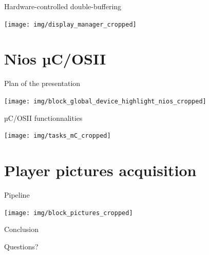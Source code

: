 \documentclass[10pt, notes]{beamer}
\begin{document}
\begin{frame}{Hardware-controlled double-buffering}
    \begin{center}
        \texttt{[image: img/display\_manager\_cropped]}
    \end{center}
    

\end{frame}

\section{Nios µC/OSII}
\begin{frame}{Plan of the presentation}
    \begin{center}
        \texttt{[image: img/block\_global\_device\_highlight\_nios\_cropped]}
    \end{center}
\end{frame}

\begin{frame}{µC/OSII functionnalities}
    \begin{center}
        \texttt{[image: img/tasks\_mC\_cropped]}
    \end{center}
\end{frame}

\section{Player pictures acquisition}

\begin{frame}{Pipeline}
    \begin{center}
        \texttt{[image: img/block\_pictures\_cropped]}
    \end{center}
\end{frame}

\begin{frame}[standout]
    Conclusion
\end{frame}

\begin{frame}[standout]
    Questions?
\end{frame}

\appendix

%  	
%  	
\end{document}
